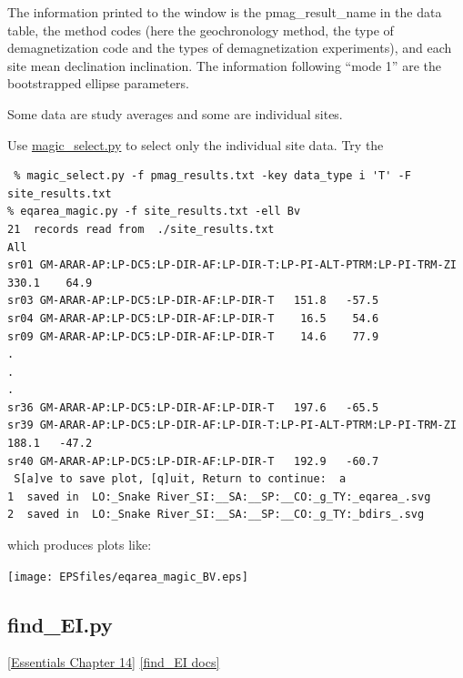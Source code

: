 \documentclass[11pt]{book}
\begin{document}
{{{The information printed to the window is the pmag\_result\_name in the data table, the method codes (here the geochronology method, the type of demagnetization code and the types of demagnetization experiments), and each site mean declination  inclination.    The information following ``mode 1'' are the bootstrapped ellipse parameters.

Some data are study averages and some are individual sites.
 
 Use \href{#magic_select.py}{magic\_select.py} to select only the individual site data.  Try the 
 
 \begin{verbatim}
 % magic_select.py -f pmag_results.txt -key data_type i 'T' -F site_results.txt
% eqarea_magic.py -f site_results.txt -ell Bv
21  records read from  ./site_results.txt
All
sr01 GM-ARAR-AP:LP-DC5:LP-DIR-AF:LP-DIR-T:LP-PI-ALT-PTRM:LP-PI-TRM-ZI   330.1    64.9
sr03 GM-ARAR-AP:LP-DC5:LP-DIR-AF:LP-DIR-T   151.8   -57.5
sr04 GM-ARAR-AP:LP-DC5:LP-DIR-AF:LP-DIR-T    16.5    54.6
sr09 GM-ARAR-AP:LP-DC5:LP-DIR-AF:LP-DIR-T    14.6    77.9
.
.
.
sr36 GM-ARAR-AP:LP-DC5:LP-DIR-AF:LP-DIR-T   197.6   -65.5
sr39 GM-ARAR-AP:LP-DC5:LP-DIR-AF:LP-DIR-T:LP-PI-ALT-PTRM:LP-PI-TRM-ZI   188.1   -47.2
sr40 GM-ARAR-AP:LP-DC5:LP-DIR-AF:LP-DIR-T   192.9   -60.7
 S[a]ve to save plot, [q]uit, Return to continue:  a
1  saved in  LO:_Snake River_SI:__SA:__SP:__CO:_g_TY:_eqarea_.svg
2  saved in  LO:_Snake River_SI:__SA:__SP:__CO:_g_TY:_bdirs_.svg
\end{verbatim}

which produces plots like:

 \texttt{[image: EPSfiles/eqarea\_magic\_BV.eps]}






\subsection{find\_EI.py}
 \href{http://magician.ucsd.edu/Essentials_2/WebBook2ch14.html#ch14}{ [Essentials Chapter 14]}%
\href{http://earthref.org/PmagPy/pmagpydocs/find_EI-module.html}{[find\_EI docs]}

}}}
\end{document}
